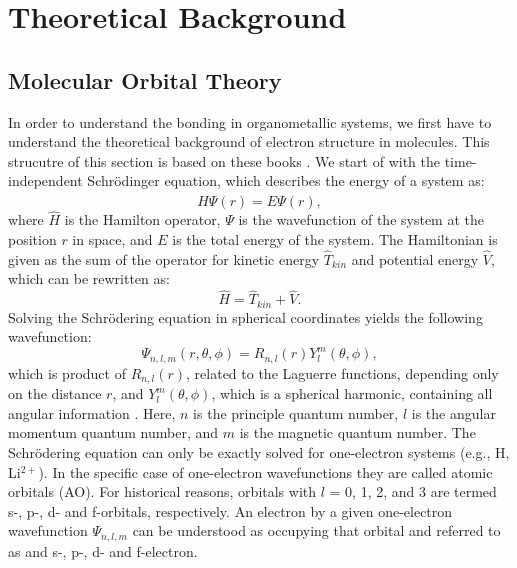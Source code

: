 \chapter{Theoretical Background}
\label{chapter:background}
\section{Molecular Orbital Theory}
\label{sec:MO_theory}
In order to understand the bonding in organometallic systems, we first have to understand the theoretical background of electron structure in molecules. This strucutre of this section is based on these books \cite{atkins2011molecular, albright2013orbital}. We start of with the time-independent Schr\"odinger equation, which describes the energy of a system as:
\begin{equation}
    \hat{H}\Psi(r) = E\Psi(r),
    \label{eq:Schroedinger_equation}
\end{equation}
where $\hat{H}$ is the Hamilton operator, $\Psi$ is the wavefunction of the system at the position $r$ in space, and $E$ is the total energy of the system. The Hamiltonian is given as the sum of the operator for kinetic energy $\hat{T}_{kin}$ and potential energy $\hat{V}$, which can be rewritten as:
\begin{equation}
    \hat{H} = \hat{T}_{kin} + \hat{V}.
    \label{eq:Hamilton_operator}
\end{equation}
Solving the Schr\"odering equation in spherical coordinates yields the following wavefunction:
\begin{equation}
    \Psi_{n, l, m}(r, \theta, \phi) = R_{n, l}(r)Y_{l}^{m}(\theta, \phi),
    \label{eq:soltion_hydrogen}
\end{equation}
which is product of $R_{n, l}(r)$, related to the Laguerre functions, depending only on the distance $r$, and $Y_{l}^{m}(\theta, \phi)$, which is a spherical harmonic, containing all angular information \cite{atkins2011molecular}. Here, $n$ is the principle quantum number, $l$ is the angular momentum quantum number, and $m$ is the magnetic quantum number. The Schr\"odering equation can only be exactly solved for one-electron systems (e.g., H, Li$^{2+}$). In the specific case of one-electron wavefunctions they are called atomic orbitals (AO). For historical reasons, orbitals with $l$ = 0, 1, 2, and 3 are termed s-, p-, d- and f-orbitals, respectively. An electron by a given one-electron wavefunction $\Psi_{n, l, m}$ can be understood as occupying that orbital and referred to as and s-, p-, d- and f-electron. \\
